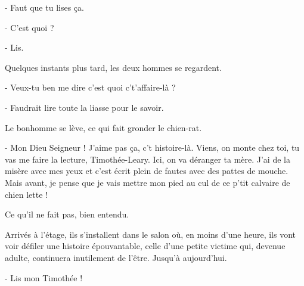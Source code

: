 - Faut que tu lises ça.

- C’est quoi ?

- Lis.

Quelques instants plus tard, les deux hommes se regardent.

- Veux-tu ben me dire c’est quoi c’t’affaire-là ?

- Faudrait lire toute la liasse pour le savoir.

Le bonhomme se lève, ce qui fait gronder le chien-rat.

- Mon Dieu Seigneur ! J’aime pas ça, c’t histoire-là. Viens, on monte chez toi, tu vas me faire la lecture, Timothée-Leary. Ici, on va déranger ta mère. J’ai de la misère avec mes yeux et c’est écrit plein de fautes avec des pattes de mouche. Mais avant, je pense que je vais mettre mon pied au cul de ce p’tit calvaire de chien lette !

Ce qu’il ne fait pas, bien entendu.

Arrivés à l’étage, ils s’installent dans le salon où, en moins d’une heure, ils vont voir défiler une histoire épouvantable, celle d’une petite victime qui, devenue adulte, continuera inutilement de l’être. Jusqu’à aujourd’hui.

- Lis mon Timothée !